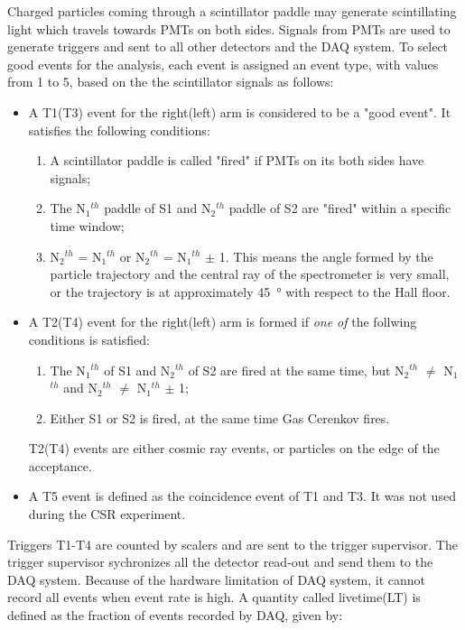 Charged particles coming through a scintillator paddle may generate scintillating light which travels towards
PMTs on both sides. Signals from PMTs are used to generate triggers and sent to all other detectors and the DAQ system.
To select good events for the analysis, each event is assigned an event type, with values from 1 to 5, based on the 
the scintillator signals as follows: 

\begin{itemize}
\item A T1(T3) event for the right(left) arm is considered to be a "good event". It satisfies the following conditions:
  \begin{enumerate}
    \item A scintillator paddle is called "fired" if PMTs on its both sides have signals;
    \item The N$_1$$^{th}$ paddle of S1 and N$_2$$^{th}$ paddle of S2 are "fired" within a specific time window;
    \item N$_2$$^{th}$ = N$_1$$^{th}$ or N$_2$$^{th}$ = N$_1$$^{th}$ $\pm$ 1. This means the angle formed by the particle trajectory
    and the central ray of the spectrometer is very small, or the trajectory is at approximately \SI{45}{\degree} with respect to the Hall floor.
  \end{enumerate}

 \item A T2(T4) event for the right(left) arm is formed if \textit{one of} the follwing conditions is satisfied:
  \begin{enumerate}
  \item The N$_1$$^{th}$ of S1 and N$_2$$^{th}$ of S2 are fired at the same time, but
        N$_2$$^{th}$ $\neq$ N$_1$$^{th}$ and N$_2$$^{th}$ $\neq$ N$_1$$^{th}$ $\pm$ 1;
  \item Either S1 or S2 is fired, at the same time Gas Cerenkov fires.
  \end{enumerate}
  T2(T4) events are either cosmic ray events, or particles on the edge of the acceptance.

 \item A T5 event is defined as the coincidence event of T1 and T3. It was not used during the CSR experiment.
\end{itemize}

Triggers T1-T4 are counted by scalers and are sent to the trigger supervisor. The trigger supervisor sychronizes all the
detector read-out and send them to the DAQ system. Because of the hardware limitation of DAQ system, it cannot record all
events when event rate is high. A quantity called livetime(LT) is defined as the fraction of events
recorded by DAQ, given by:

